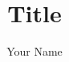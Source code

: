 \documentclass{article}
\title{Title}
\author{Your Name}
\begin{document}
 




\maketitle{} 

\tableofcontents
\newpage

\listoftodos
\newpage


  













\end{document}
